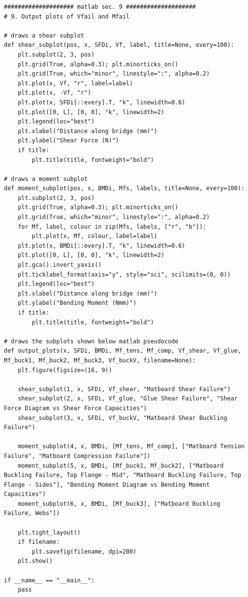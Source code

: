 \begin{verbatim}
#################### matlab sec. 9 ####################
# 9. Output plots of Vfail and Mfail

# draws a shear subplot
def shear_subplot(pos, x, SFDi, Vf, label, title=None, every=100):
    plt.subplot(2, 3, pos)
    plt.grid(True, alpha=0.3); plt.minorticks_on()
    plt.grid(True, which="minor", linestyle=":", alpha=0.2)
    plt.plot(x, Vf, "r", label=label)
    plt.plot(x, -Vf, "r")
    plt.plot(x, SFDi[::every].T, "k", linewidth=0.6)
    plt.plot([0, L], [0, 0], "k", linewidth=2)
    plt.legend(loc="best")
    plt.xlabel("Distance along bridge (mm)")
    plt.ylabel("Shear Force (N)")
    if title:
        plt.title(title, fontweight="bold")

# draws a moment subplot
def moment_subplot(pos, x, BMDi, Mfs, labels, title=None, every=100):
    plt.subplot(2, 3, pos)
    plt.grid(True, alpha=0.3); plt.minorticks_on()
    plt.grid(True, which="minor", linestyle=":", alpha=0.2)
    for Mf, label, colour in zip(Mfs, labels, ["r", "b"]):
        plt.plot(x, Mf, colour, label=label)
    plt.plot(x, BMDi[::every].T, "k", linewidth=0.6)
    plt.plot([0, L], [0, 0], "k", linewidth=2)
    plt.gca().invert_yaxis()
    plt.ticklabel_format(axis="y", style="sci", scilimits=(0, 0))
    plt.legend(loc="best")
    plt.xlabel("Distance along bridge (mm)")
    plt.ylabel("Bending Moment (Nmm)")
    if title:
        plt.title(title, fontweight="bold")

# draws the subplots shown below matlab pseudocode
def output_plots(x, SFDi, BMDi, Mf_tens, Mf_comp, Vf_shear, Vf_glue, Mf_buck1, Mf_buck2, Mf_buck3, Vf_buckV, filename=None):
    plt.figure(figsize=(16, 9))

    shear_subplot(1, x, SFDi, Vf_shear, "Matboard Shear Failure")
    shear_subplot(2, x, SFDi, Vf_glue, "Glue Shear Failure", "Shear Force Diagram vs Shear Force Capacities")
    shear_subplot(3, x, SFDi, Vf_buckV, "Matboard Shear Buckling Failure")

    moment_subplot(4, x, BMDi, [Mf_tens, Mf_comp], ["Matboard Tension Failure", "Matboard Compression Failure"])
    moment_subplot(5, x, BMDi, [Mf_buck1, Mf_buck2], ["Matboard Buckling Failure, Top Flange - Mid", "Matboard Buckling Failure, Top Flange - Sides"], "Bending Moment Diagram vs Bending Moment Capacities")
    moment_subplot(6, x, BMDi, [Mf_buck3], ["Matboard Buckling Failure, Webs"])

    plt.tight_layout()
    if filename:
        plt.savefig(filename, dpi=200)
    plt.show()

if __name__ == "__main__":
    pass
\end{verbatim}